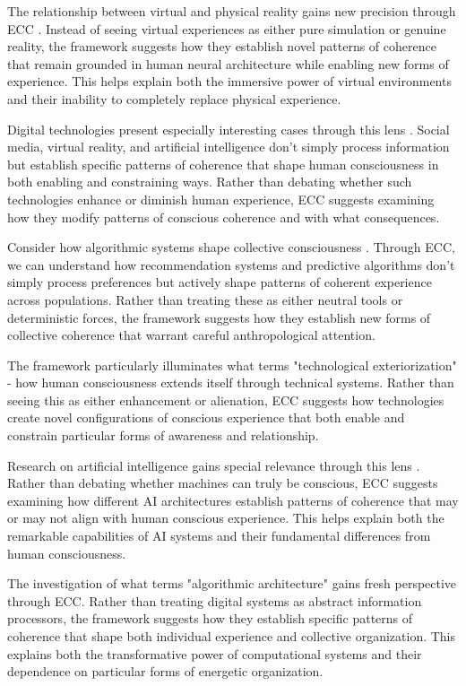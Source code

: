 The relationship between virtual and physical reality gains new precision through ECC \cite{turkle2011alone}. Instead of seeing virtual experiences as either pure simulation or genuine reality, the framework suggests how they establish novel patterns of coherence that remain grounded in human neural architecture while enabling new forms of experience. This helps explain both the immersive power of virtual environments and their inability to completely replace physical experience.

Digital technologies present especially interesting cases through this lens \cite{hayles2012how}. Social media, virtual reality, and artificial intelligence don't simply process information but establish specific patterns of coherence that shape human consciousness in both enabling and constraining ways. Rather than debating whether such technologies enhance or diminish human experience, ECC suggests examining how they modify patterns of conscious coherence and with what consequences.

Consider how algorithmic systems shape collective consciousness \cite{noble2018algorithms}. Through ECC, we can understand how recommendation systems and predictive algorithms don't simply process preferences but actively shape patterns of coherent experience across populations. Rather than treating these as either neutral tools or deterministic forces, the framework suggests how they establish new forms of collective coherence that warrant careful anthropological attention.

The framework particularly illuminates what \cite{stiegler2010taking} terms "technological exteriorization" - how human consciousness extends itself through technical systems. Rather than seeing this as either enhancement or alienation, ECC suggests how technologies create novel configurations of conscious experience that both enable and constrain particular forms of awareness and relationship.

Research on artificial intelligence gains special relevance through this lens \cite{clark2003natural}. Rather than debating whether machines can truly be conscious, ECC suggests examining how different AI architectures establish patterns of coherence that may or may not align with human conscious experience. This helps explain both the remarkable capabilities of AI systems and their fundamental differences from human consciousness.

The investigation of what \cite{parisi2013contagious} terms "algorithmic architecture" gains fresh perspective through ECC. Rather than treating digital systems as abstract information processors, the framework suggests how they establish specific patterns of coherence that shape both individual experience and collective organization. This explains both the transformative power of computational systems and their dependence on particular forms of energetic organization.

